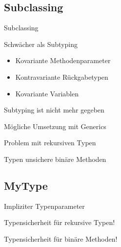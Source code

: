 \subsection{Subclassing}
\begin{frame}{Subclassing}
	\begin{bigitemize}[<+->]{3mm}
		\item Schwächer als Subtyping
		\begin{itemize}
			\item<1-> Kovariante Methodenparameter

			\item<1-> Kontravariante Rückgabetypen

			\item<1-> Kovariante Variablen
		\end{itemize}

		\item Subtyping ist nicht mehr gegeben

		\item Mögliche Umsetzung mit Generics

		\item Problem mit rekursiven Typen

		\item Typen unsichere binäre Methoden
	\end{bigitemize}
\end{frame}

\subsection{MyType}
\begin{frame}{\mytype}
	\begin{bigitemize}{3mm}
		\item Impliziter Typenparameter

		\item Typensicherheit für rekursive Typen!

		\item Typensicherheit für binäre Methoden!
	\end{bigitemize}
\end{frame}

